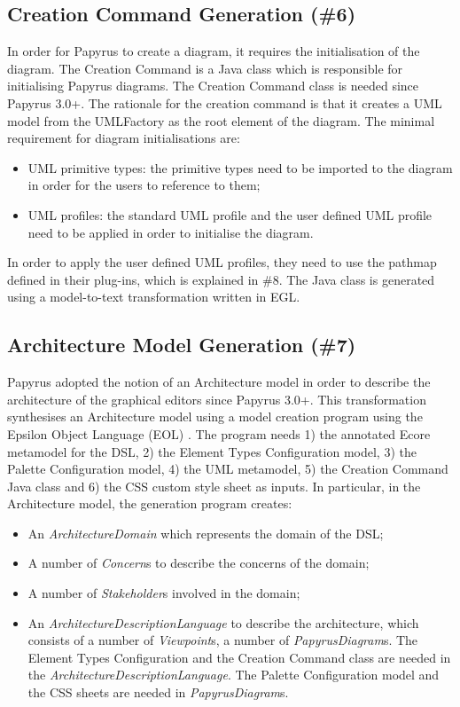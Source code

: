 \subsection{Creation Command Generation (\#6)}
\label{sec:creationCommand}
In order for Papyrus to create a diagram, it requires the initialisation of the diagram.
The Creation Command is a Java class which is responsible for initialising Papyrus diagrams. 
The Creation Command class is needed since Papyrus 3.0+.
The rationale for the creation command is that it creates a UML model from the UMLFactory as the root element of the diagram.
The minimal requirement for diagram initialisations are:
\begin{itemize}
	\item UML primitive types: the primitive types need to be imported to the diagram in order for the users to reference to them;
	\item UML profiles: the standard UML profile and the user defined UML profile need to be applied in order to initialise the diagram.
\end{itemize}

In order to apply the user defined UML profiles, they need to use the pathmap defined in their plug-ins, which is explained in \#8.
The Java class is generated using a model-to-text transformation written in EGL.

\subsection{Architecture Model Generation (\#7)}
\label{sec:architectureModel}
Papyrus adopted the notion of an Architecture model in order to describe the architecture of the graphical editors since Papyrus 3.0+.
This transformation synthesises an Architecture model using a model creation program using the Epsilon Object Language (EOL) \cite{kolovos2006epsilon}. 
The program needs 1) the annotated Ecore metamodel for the DSL, 2) the Element Types Configuration model, 3) the Palette Configuration model, 4) the UML metamodel, 5) the Creation Command Java class and 6) the CSS custom style sheet as inputs. 
In particular, in the Architecture model, the generation program creates:
\begin{itemize}
	\item An \textit{ArchitectureDomain} which represents the domain of the DSL;
	\item A number of \textit{Concern}s to describe the concerns of the domain;
	\item A number of \textit{Stakeholder}s involved in the domain;
	\item An \textit{ArchitectureDescriptionLanguage} to describe the architecture, which consists of a number of \textit{Viewpoint}s, a number of \textit{PapyrusDiagram}s. 
	The Element Types Configuration and the Creation Command class are needed in the \textit{ArchitectureDescriptionLanguage}. 
	The Palette Configuration model and the CSS sheets are needed in \textit{PapyrusDiagram}s.
\end{itemize}

